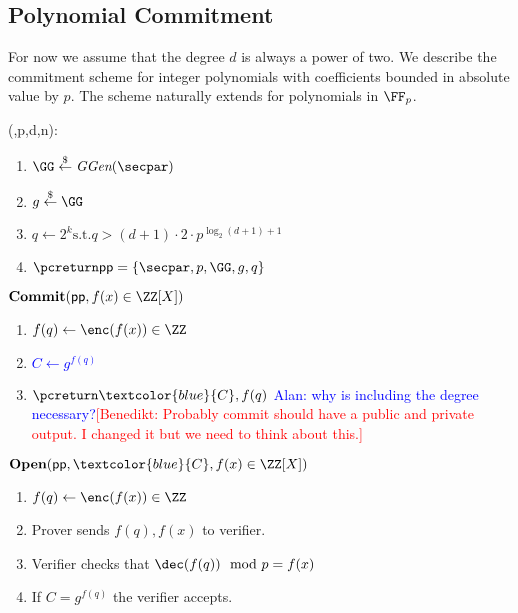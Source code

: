 \documentclass{article}
\newcommand{\benedikt}[1]{{\textcolor{red}{[Benedikt: #1]}}}
\newcommand{\benedikt}[1]{}
\begin{document}
\subsection{Polynomial Commitment}
 For now we assume that the degree $d$ is always a power of two. We describe the commitment scheme for integer polynomials with coefficients bounded in absolute value by $p$. The scheme naturally extends for polynomials in $\FF_p$.

\begin{mdframed}[userdefinedwidth=0.8\textwidth]
\begin{minipage}{\textwidth}
	\begin{flushleft}
	\setup(\secpar,p,d,n):
		\begin{enumerate}[nolistsep]
			\item $ \GG \sample \ggen(\secpar)$
			\item $ g \sample \GG$
			\item $q\gets 2^k \text{s.t.} q>(d+1) \cdot 2\cdot p^{\log_2(d+1)+1} $
			\item $\pcreturn \crs=\{\secpar,p,\GG,g,q\}$
		\end{enumerate}
		$\commit(\crs,f(x)\in \ZZ[X])$  
		\begin{enumerate}[nolistsep]
			\item 	$f(q)\gets \enc(f(x)) \in \ZZ$
			\item \textcolor{blue}{$C \gets g^{f(q)}$}
			\item $\pcreturn \textcolor{blue}{C},f(q)$ \textcolor{blue}{Alan: why is including the degree necessary?}\benedikt{Probably commit should have a public and private output. I changed it but we need to think about this.}
		\end{enumerate}
		$\open(\crs,\textcolor{blue}{C},f(x)\in \ZZ[X])$ \pccomment{\textcolor{blue}{$f(x)$'s coefficients are in $[-q/2,q/2]$}} 
		\begin{enumerate}[nolistsep]
			\item $f(q)\gets \enc(f(x)) \in \ZZ$
			\item Prover sends $f(q),f(x)$ to verifier.
			\item Verifier checks that $\dec(f(q)) \mod p=f(x)$
			\item If $C=g^{f(q)}$ the verifier accepts.
		\end{enumerate}
	\end{flushleft}
	
\end{minipage}
\end{mdframed}
\end{document}
